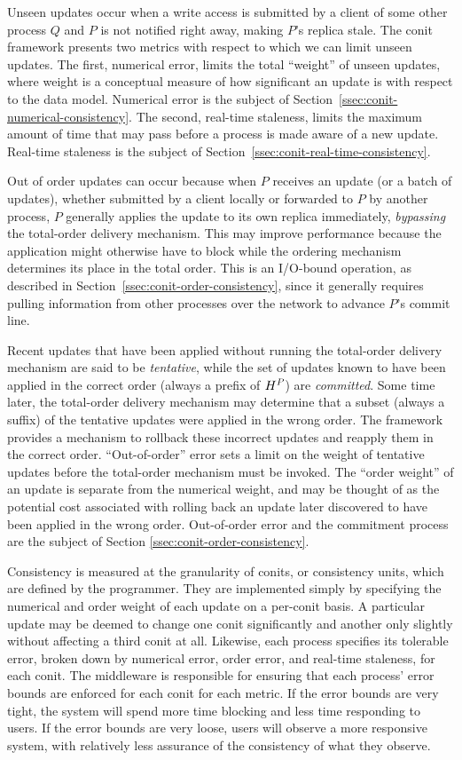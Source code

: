 \documentclass[]             %
{NASA}                       %
\theoremstyle{definition}
\begin{document}
Unseen updates occur when a write access is submitted by a client of
some other process $Q$ and $P$ is not notified right away, making
$P$'s replica stale. The conit framework presents two metrics with
respect to which we can limit unseen updates. The first, numerical
error, limits the total ``weight'' of unseen updates, where weight is
a conceptual measure of how significant an update is with respect to
the data model. Numerical error is the subject of
Section~\ref{ssec:conit-numerical-consistency}. The second, real-time
staleness, limits the maximum amount of time that may pass before a
process is made aware of a new update. Real-time staleness is the
subject of Section~\ref{ssec:conit-real-time-consistency}.

Out of order updates can occur because when $P$ receives an update (or
a batch of updates), whether submitted by a client locally or
forwarded to $P$ by another process, $P$ generally applies the update
to its own replica immediately, \emph{bypassing} the total-order
delivery mechanism. This may improve performance because the
application might otherwise have to block while the ordering mechanism
determines its place in the total order. This is an I/O-bound
operation, as described in Section~\ref{ssec:conit-order-consistency},
since it generally requires pulling information from other processes
over the network to advance $P$'s commit line.

Recent updates that have been applied without running the total-order
delivery mechanism are said to be \emph{tentative}, while the set of
updates known to have been applied in the correct order (always a
prefix of $H^{P}$) are \emph{committed}. Some time later,
the total-order delivery mechanism may determine that a subset (always
a suffix) of the tentative updates were applied in the wrong
order. The framework provides a mechanism to rollback these incorrect
updates and reapply them in the correct order. ``Out-of-order'' error
sets a limit on the weight of tentative updates before the total-order
mechanism must be invoked. The ``order weight'' of an update is
separate from the numerical weight, and may be thought of as the
potential cost associated with rolling back an update later discovered to
have been applied in the wrong order. Out-of-order error and the
commitment process are the subject of Section
\ref{ssec:conit-order-consistency}.

Consistency is measured at the granularity of conits, or consistency
units, which are defined by the programmer. They are implemented
simply by specifying the numerical and order weight of each update on
a per-conit basis. A particular update may be deemed to change one
conit significantly and another only slightly without affecting a
third conit at all. Likewise, each process specifies its tolerable
error, broken down by numerical error, order error, and real-time
staleness, for each conit. The middleware is responsible for ensuring
that each process' error bounds are enforced for each conit for each
metric. If the error bounds are very tight, the system will spend more
time blocking and less time responding to users. If the error bounds
are very loose, users will observe a more responsive system, with
relatively less assurance of the consistency of what they observe.
\end{document}
